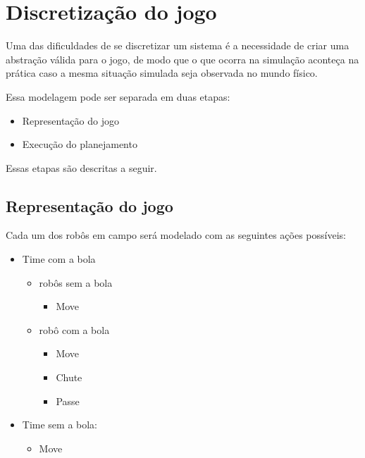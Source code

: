 \section{Discretização do jogo}\label{sec:mapeamento}

Uma das dificuldades de se discretizar um sistema é a necessidade de criar uma
abstração válida para o jogo, de modo que o que ocorra na simulação aconteça na
prática caso a mesma situação simulada seja observada no mundo físico.

Essa modelagem pode ser separada em duas etapas:

\begin{itemize}
  \item Representação do jogo
  \item Execução do planejamento
\end{itemize}

Essas etapas são descritas a seguir.

\subsection{Representação do jogo}

Cada um dos robôs em campo será modelado com as seguintes ações possíveis:
\begin{itemize}
  \item Time com a bola
  \begin{itemize}
    \item robôs sem a bola
    \begin{itemize}
       \item Move
    \end{itemize}
    \item robô com a bola
    \begin{itemize}
       \item Move
       \item Chute
       \item Passe
    \end{itemize}
  \end{itemize}
  \item Time sem a bola:
  \begin{itemize}
    \item Move
  \end{itemize}
\end{itemize}

